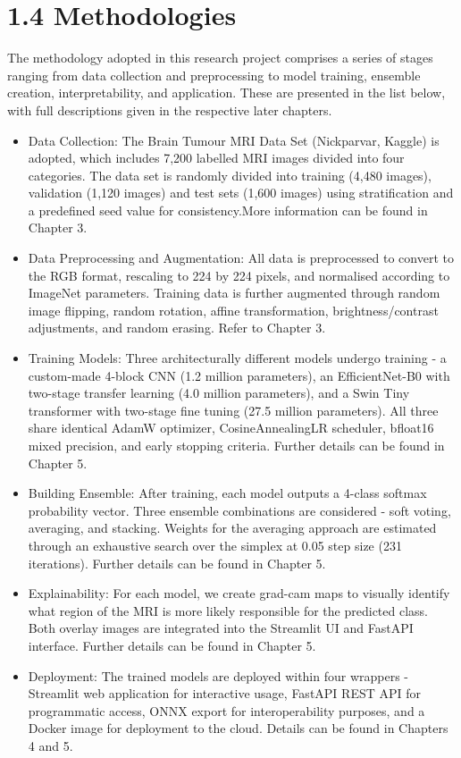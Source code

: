 \documentclass[12pt,a4paper,oneside]{report}
\begin{document}
\section{1.4 Methodologies}
The methodology adopted in this research project comprises a series of stages ranging from data collection and preprocessing to model training, ensemble creation, interpretability, and application. These are presented in the list below, with full descriptions given in the respective later chapters.
\begin{itemize}[leftmargin=*]
  \item Data Collection: The Brain Tumour MRI Data Set (Nickparvar, Kaggle) is adopted, which includes 7,200 labelled MRI images divided into four categories. The data set is randomly divided into training (4,480 images), validation (1,120 images) and test sets (1,600 images) using stratification and a predefined seed value for consistency.More information can be found in Chapter 3.
  \item Data Preprocessing and Augmentation: All data is preprocessed to convert to the RGB format, rescaling to 224 by 224 pixels, and normalised according to ImageNet parameters. Training data is further augmented through random image flipping, random rotation, affine transformation, brightness/contrast adjustments, and random erasing. Refer to Chapter 3.
  \item Training Models: Three architecturally different models undergo training - a custom-made 4-block CNN (1.2 million parameters), an EfficientNet-B0 with two-stage transfer learning (4.0 million parameters), and a Swin Tiny transformer with two-stage fine tuning (27.5 million parameters). All three share identical AdamW optimizer, CosineAnnealingLR scheduler, bfloat16 mixed precision, and early stopping criteria. Further details can be found in Chapter 5.
  \item Building Ensemble: After training, each model outputs a 4-class softmax probability vector. Three ensemble combinations are considered - soft voting, averaging, and stacking. Weights for the averaging approach are estimated through an exhaustive search over the simplex at 0.05 step size (231 iterations). Further details can be found in Chapter 5.
  \item Explainability: For each model, we create grad-cam maps to visually identify what region of the MRI is more likely responsible for the predicted class. Both overlay images are integrated into the Streamlit UI and FastAPI interface. Further details can be found in Chapter 5.
  \item Deployment: The trained models are deployed within four wrappers - Streamlit web application for interactive usage, FastAPI REST API for programmatic access, ONNX export for interoperability purposes, and a Docker image for deployment to the cloud. Details can be found in Chapters 4 and 5.
\end{itemize}
\end{document}
